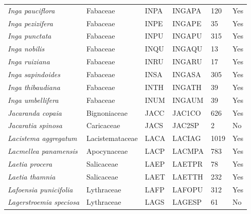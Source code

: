 \documentclass[11pt]{article}
\begin{document}
\begin{longtable}{@{}llllll@{}}
\textit{Inga pauciflora}                              & Fabaceae         & INPA   & INGAPA & 120             & Yes       \\
\textit{Inga pezizifera}                              & Fabaceae         & INPE   & INGAPE & 35              & Yes       \\
\textit{Inga punctata}                                & Fabaceae         & INPU   & INGAPU & 315             & Yes       \\
\textit{Inga nobilis}                                 & Fabaceae         & INQU   & INGAQU & 13              & Yes       \\
\textit{Inga ruiziana}                                & Fabaceae         & INRU   & INGARU & 17              & Yes       \\
\textit{Inga sapindoides}                             & Fabaceae         & INSA   & INGASA & 305             & Yes       \\
\textit{Inga thibaudiana}                             & Fabaceae         & INTH   & INGATH & 39              & Yes       \\
\textit{Inga umbellifera}                             & Fabaceae         & INUM   & INGAUM & 39              & Yes       \\
\textit{Jacaranda copaia}                             & Bignoniaceae     & JACC   & JAC1CO & 626             & Yes       \\
\textit{Jacaratia spinosa}                            & Caricaceae       & JACS   & JAC2SP & 2               & No        \\
\textit{Lacistema aggregatum}                         & Lacistemataceae  & LACA   & LACIAG & 1019            & Yes       \\
\textit{Lacmellea panamensis}                         & Apocynaceae      & LACP   & LACMPA & 783             & Yes       \\
\textit{Laetia procera}                               & Salicaceae       & LAEP   & LAETPR & 78              & Yes       \\
\textit{Laetia thamnia}                               & Salicaceae       & LAET   & LAETTH & 232             & Yes       \\
\textit{Lafoensia punicifolia}                        & Lythraceae       & LAFP   & LAFOPU & 312             & Yes       \\
\textit{Lagerstroemia speciosa}                       & Lythraceae       & LAGS   & LAGESP & 61              & No        \\

\end{longtable}
\end{document}
